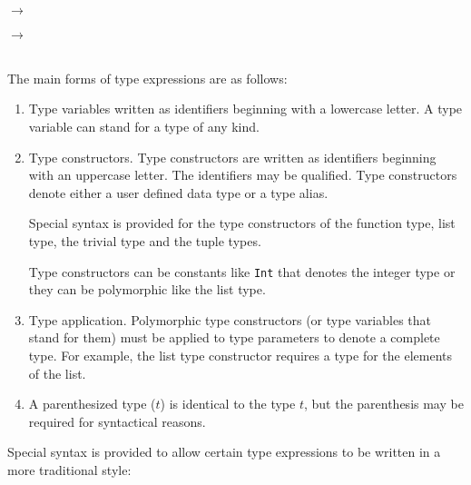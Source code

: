 \begin{flushleft}
  
  \alt{} \sym{(}  \sym{)} \\
 
  \alt \sym{\bracka\brackz}  
  \alt \sym{()}              
  \alt \sym{(}\more{\sym{,}}\sym{)} 
  \alt $\rightarrow{}$ \\
 \\
 
  \alt {} $\rightarrow{}$ \\
 \sym{*} \alt \sym{(}  \sym{)}\\
\end{flushleft}

The main forms of type expressions are as follows:

\begin{enumerate}
\item Type variables written as identifiers beginning with a lowercase letter.  A type variable can stand for a type of any kind.
\item Type constructors. Type constructors are written as identifiers beginning with an uppercase letter. The identifiers may be qualified. Type constructors denote either a user defined data type or a type alias.

Special syntax is provided for the type constructors of the function type, list type, the trivial type and the tuple types.

Type constructors can be constants like \texttt{Int} that denotes the integer type or they can be polymorphic like the list type.
\item Type application. Polymorphic type constructors (or type variables that stand for them) must be applied to type parameters to denote a complete type. For example, the list type constructor requires a type for the elements of the list. 
\item A parenthesized type ($t$) is identical to the type $t$, but the parenthesis may be required for syntactical reasons.
\end{enumerate}

Special syntax is provided to allow certain type expressions to be written in a more traditional style:

